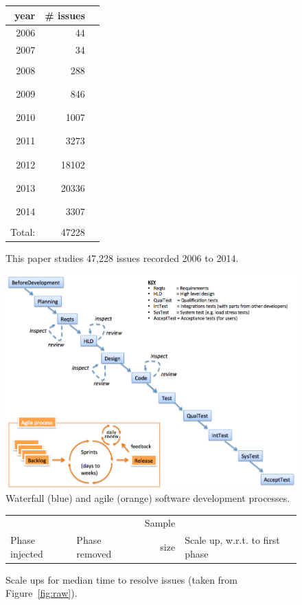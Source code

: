 \documentclass{sig-alternate}
\newcommand{\fig}[1]{Figure~\ref{fig:#1}}
\def\baselinestretch{1}
\begin{document}
 
\begin{figure}
\begin{center}
\scriptsize
\begin{tabular}{rrl}
year& \# issues&\\\hline
2006 &  44 &\\
2007 &  34 &\\
2008&  288 &\rule{1mm}{2mm}\\
2009&  846 &\rule{3mm}{2mm}\\
2010& 1007 &\rule{3mm}{2mm}\\
2011& 3273 &\rule{10mm}{2mm}\\
2012&18102 &\rule{45mm}{2mm}\\
2013&20336 &\rule{50mm}{2mm}\\
2014& 3307 & \rule{10mm}{2mm}\\\cline{1-2}
Total:&47228
\end{tabular}
\end{center}
\caption{This paper studies 47,228 issues recorded 2006 to 2014.}\label{fig:years}
\end{figure}
\begin{figure}[!t]
\begin{center}
\includegraphics[width=6in]{waterfall2.png}
\end{center}
\caption{Waterfall (blue) and agile (orange) software development processes.}
\end{figure}


\begin{figure}[!t]

\renewcommand{\baselinestretch}{0.7}
\small
\begin{center}
\begin{tabular}{ll|r|rl}
            &                  & Sample\\
Phase injected & Phase removed & size & \multicolumn{2}{l}{Scale up, w.r.t. to first phase}

\end{tabular}
\end{center}
\caption{Scale ups for median time to resolve issues (taken from \fig{raw}).}
\label{fig:scale}
\end{figure}
\end{document}
